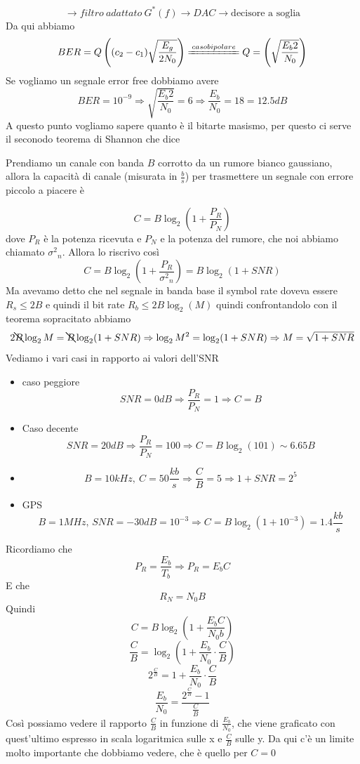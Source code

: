 \documentclass{article}
\begin{document}
\[\to\boxed{filtro\ adattato\ G^*(f)}\to\boxed{DAC}\to\boxed{\text{decisore a soglia}}\]
Da qui abbiamo 
\[BER=Q\left((c_2-c_1)\sqrt{\frac{E_g}{2N_0}}\right)\xlongequal{caso bipolare}Q=\left(\sqrt{\frac{E_b 2}{N_0}}\right)\]
Se vogliamo un segnale error free dobbiamo avere
\[BER=10^{-9}\Rightarrow\sqrt{\frac{E_b 2}{N_0}}=6\Rightarrow\frac{E_b}{N_0}=18=12.5dB\]
A questo punto vogliamo sapere quanto è il bitarte masismo, per questo ci serve il seconodo teorema di Shannon che dice
\begin{center}
    Prendiamo un canale con banda \(B\) corrotto da un rumore bianco gaussiano, allora la capacità di canale (misurata in \(\frac{b}{s}\)) per trasmettere un segnale con errore piccolo a piacere è
\end{center}
\[C=B\log_2\left(1+\frac{P_R}{P_N}\right)\]
dove \(P_R\) è la potenza ricevuta e \(P_N\) e la potenza del rumore, che noi abbiamo chiamato \({\sigma^2}_n\). Allora lo riscrivo così
\[C=B\log_2\left(1+\frac{P_R}{{\sigma^2}_n}\right)=B\log_2(1+SNR)\]
Ma avevamo detto che nel segnale in banda base il symbol rate doveva essere \(R_s\leq 2B\) e quindi il bit rate \(R_b\leq2B\log_2(M)\) quindi confrontandolo con il teorema sopracitato abbiamo
\[2\bcancel{B}\log_2 M=\bcancel{B}\log_2(1+SNR)\Rightarrow \log_2 M^2=\log_2(1+SNR)\Rightarrow M=\sqrt{1+SNR}\]
Vediamo i vari casi in rapporto ai valori dell'SNR
\begin{itemize}
    \item caso peggiore
        \[SNR=0dB\Rightarrow\frac{P_R}{P_N}=1\Rightarrow C=B\]
    \item Caso decente
        \[SNR=20dB\Rightarrow\frac{P_R}{P_N}=100\Rightarrow C=B\log_2(101)\sim 6.65B\]
    \item 
        \[B=10kHz,\ C=50\frac{kb}{s}\Rightarrow \frac{C}{B}=5\Rightarrow 1+SNR=2^5\]
    \item GPS
        \[B=1MHz,\, SNR=-30dB=10^{-3}\Rightarrow C=B\log_2(1+10^{-3})=1.4\frac{kb}{s}\]
\end{itemize}
Ricordiamo che
\[P_R=\frac{E_b}{T_b}\Rightarrow P_R=E_b C\]
E che
\[R_N=N_0 B\]
Quindi
\[C=B\log_2\left(1+\frac{E_b C}{N_0 b}\right)\]
\[\frac{C}{B}=\log_2\left(1+\frac{E_b}{N_0}\cdot\frac{C}{B}\right)\]
\[2^{\frac{C}{B}}=1+\frac{E_b}{N_0}\cdot\frac{C}{B}\]
\[\frac{E_b}{N_0}=\frac{2^{\frac{C}{B}}-1}{\frac{C}{B}}\]
Così possiamo vedere il rapporto \(\frac{C}{B}\) in funzione di \(\frac{E_b}{N_0}\), che viene graficato con quest'ultimo espresso in scala logaritmica sulle x e \(\frac{C}{B}\) sulle y. Da qui c'è un limite molto importante che dobbiamo vedere, che è quello per \(C=0\)
\end{document}
